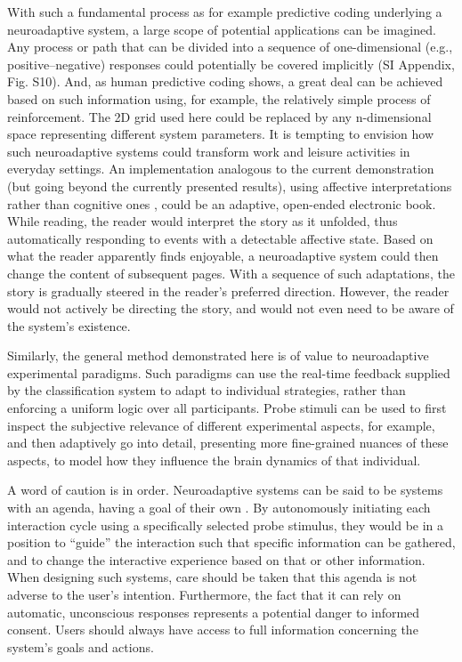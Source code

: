 With such a fundamental process as for example predictive coding underlying a neuroadaptive system, a large scope of potential applications can be imagined. Any process or path that can be divided into a sequence of one-dimensional (e.g., positive–negative) responses could potentially be covered implicitly (SI Appendix, Fig. S10). And, as human predictive coding shows, a great deal can be achieved based on such information using, for example, the relatively simple process of reinforcement. The 2D grid used here could be replaced by any n-dimensional space representing different system parameters. It is tempting to envision how such neuroadaptive systems could transform work and leisure activities in everyday settings. An implementation analogous to the current demonstration (but going beyond the currently presented results), using affective interpretations rather than cognitive ones \cite{zander2009affective}, could be an adaptive, open-ended electronic book. While reading, the reader would interpret the story as it unfolded, thus automatically responding to events with a detectable affective state. Based on what the reader apparently finds enjoyable, a neuroadaptive system could then change the content of subsequent pages. With a sequence of such adaptations, the story is gradually steered in the reader's preferred direction. However, the reader would not actively be directing the story, and would not even need to be aware of the system's existence.

Similarly, the general method demonstrated here is of value to neuroadaptive experimental paradigms. Such paradigms can use the real-time feedback supplied by the classification system to adapt to individual strategies, rather than enforcing a uniform logic over all participants. Probe stimuli can be used to first inspect the subjective relevance of different experimental aspects, for example, and then adaptively go into detail, presenting more fine-grained nuances of these aspects, to model how they influence the brain dynamics of that individual.

A word of caution is in order. Neuroadaptive systems can be said to be systems with an agenda, having a goal of their own \cite{fairclough2009fundamentals}. By autonomously initiating each interaction cycle using a specifically selected probe stimulus, they would be in a position to ``guide'' the interaction such that specific information can be gathered, and to change the interactive experience based on that or other information. When designing such systems, care should be taken that this agenda is not adverse to the user's intention. Furthermore, the fact that it can rely on automatic, unconscious responses represents a potential danger to informed consent. Users should always have access to full information concerning the system's goals and actions.

